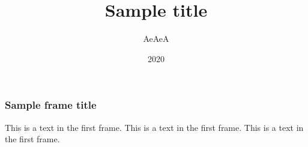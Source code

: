 \documentclass{beamer}
\title{Sample title}
\author{AeAeA}
\institute{Whitechno}
\date{2020}
\begin{document}
 
\frame{\titlepage}
 
\begin{frame}
\frametitle{Sample frame title}
This is a text in the first frame. This is a text in the first frame. This is a text in the first frame.
\end{frame}
 
\end{document}
